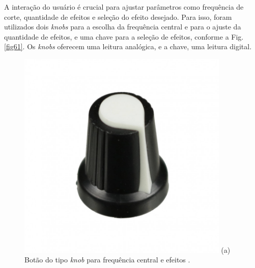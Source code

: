 A interação do usuário é crucial para ajustar parâmetros como frequência de corte, quantidade de efeitos e seleção do efeito desejado. Para isso, foram utilizados dois \textit{knobs} para a escolha da frequência central e para o ajuste da quantidade de efeitos, e uma chave para a seleção de efeitos, conforme a Fig. \ref{fig61}. Os \textit{knobs} oferecem uma leitura analógica, e a chave, uma leitura digital.


\begin{figure}[htpb]
    \centering
    \begin{minipage}[t]{0.3\textwidth}
        \centering
        \includegraphics[width=0.9\textwidth]{figuras/fig61.jpg}
        \vspace{0.3cm} %
        (a) Botão do tipo \textit{knob} para frequência central e efeitos \cite{robocore}.
    \end{minipage}
    \hspace{2cm} %
    \begin{minipage}[t]{0.3\textwidth}
        \centering

\end{minipage}
\end{figure}
